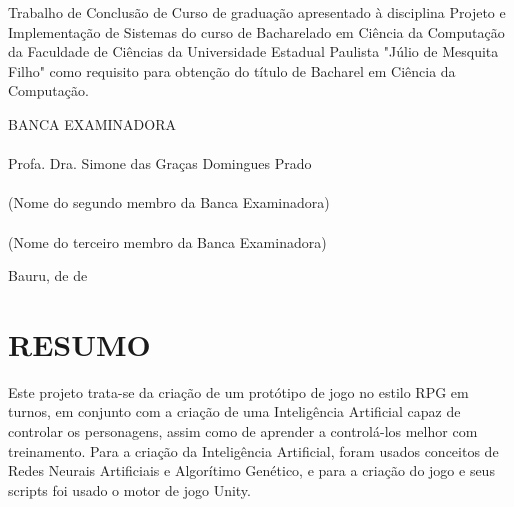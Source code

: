 \documentclass[12pt,a4paper]{article}
\begin{document}
\begin{articleobjective}
	Trabalho de Conclusão de Curso de graduação apresentado à disciplina Projeto e Implementação de Sistemas do curso de Bacharelado em Ciência da Computação da Faculdade de Ciências da Universidade Estadual Paulista "Júlio de Mesquita Filho"{} como requisito para obtenção do título de Bacharel em Ciência da Computação.
\end{articleobjective}

\begin{center}
	\vspace{1.0cm}
	BANCA EXAMINADORA\\
	
	\vspace{1.0cm}
	\underline{\hspace{8cm}}\\
	Profa. Dra. Simone das Graças Domingues Prado\\
	\vspace{1.0cm}
	\underline{\hspace{8cm}}\\
	(Nome do segundo membro da Banca Examinadora)\\
	\vspace{1.0cm}
	\underline{\hspace{8cm}}\\
	(Nome do terceiro membro da Banca Examinadora)

	\vspace*{\fill} %
	Bauru, \underline{\hspace{1cm}} de \underline{\hspace{3cm}} de \underline{\hspace{1.5cm}}
\end{center}

\newpage %
\thispagestyle{empty} %
\section*{\hfil RESUMO} %
	\singlespace
	\noindent
	Este projeto trata-se da criação de um protótipo de jogo no estilo RPG em turnos,
	em conjunto com a criação de uma Inteligência Artificial capaz de controlar os personagens,
	assim como de aprender a controlá-los melhor com treinamento.
	Para a criação da Inteligência Artificial,
	foram usados conceitos de Redes Neurais Artificiais e Algorítimo Genético,
	e para a criação do jogo e seus scripts
	foi usado o motor de jogo Unity.
	
\end{document}
